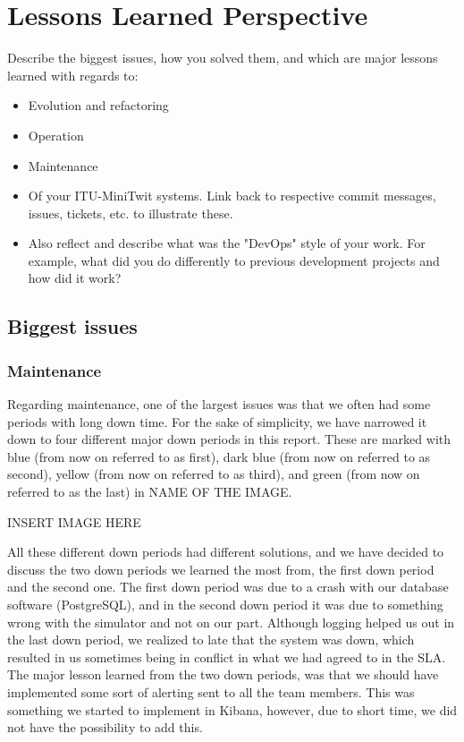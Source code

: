 \section{Lessons Learned Perspective}

Describe the biggest issues, how you solved them, and which are major lessons learned with regards to:
\begin{itemize}
  \item Evolution and refactoring
  \item Operation
  \item Maintenance
  \item Of your ITU-MiniTwit systems. Link back to respective commit messages, issues, tickets, etc. to illustrate these.
  \item Also reflect and describe what was the "DevOps" style of your work. For example, what did you do differently to previous development projects and how did it work?

\end{itemize}

\subsection{Biggest issues}

\subsubsection{Maintenance}

Regarding maintenance, one of the largest issues was that we often had some periods with long down time. For the sake of simplicity, we have narrowed it down to four different major down periods in this report. These are marked with blue (from now on referred to as first), dark blue (from now on referred to as second), yellow (from now on referred to as third), and green (from now on referred to as the last) in NAME OF THE IMAGE.

INSERT IMAGE HERE
 
All these different down periods had different solutions, and we have decided to discuss the two down periods we learned the most from, the first down period and the second one. The first down period was due to a crash with our database software (PostgreSQL), and in the second down period it was due to something wrong with the simulator and not on our part. Although logging helped us out in the last down period, we realized to late that the system was down, which resulted in us sometimes being in conflict in what we had agreed to in the SLA. The major lesson learned from the two down periods, was that we should have implemented some sort of alerting sent to all the team members. This was something we started to implement in Kibana, however, due to short time, we did not have the possibility to add this.

